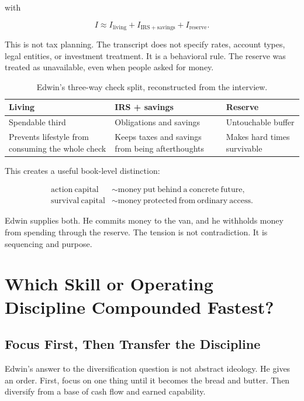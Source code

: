 \documentclass[11pt,oneside]{book}
\begin{document}
with

\begin{equation}
I\approx I_{\mathrm{living}}+I_{\mathrm{IRS+savings}}+I_{\mathrm{reserve}}.
\end{equation}

This is not tax planning. The transcript does not specify rates, account types, legal entities, or investment treatment. It is a behavioral rule. The reserve was treated as unavailable, even when people asked for money.

\begin{table}
\centering
\begin{tabular}{|p{.27\linewidth}|p{.27\linewidth}|p{.30\linewidth}|}
\hline
Living & IRS + savings & Reserve\\
\hline
Spendable third & Obligations and savings & Untouchable buffer\\
\hline
Prevents lifestyle from consuming the whole check & Keeps taxes and savings from being afterthoughts & Makes hard times survivable\\
\hline
\end{tabular}
\caption{Edwin's three-way check split, reconstructed from the interview.}
\end{table}

This creates a useful book-level distinction:

\begin{align}
\mathrm{action\ capital} &\sim \mathrm{money\ put\ behind\ a\ concrete\ future},\\
\mathrm{survival\ capital} &\sim \mathrm{money\ protected\ from\ ordinary\ access}.
\end{align}

Edwin supplies both. He commits money to the van, and he withholds money from spending through the reserve. The tension is not contradiction. It is sequencing and purpose.

\chapter{Which Skill or Operating Discipline Compounded Fastest?}

\section{Focus First, Then Transfer the Discipline}

Edwin's answer to the diversification question is not abstract ideology. He gives an order. First, focus on one thing until it becomes the bread and butter. Then diversify from a base of cash flow and earned capability.
\end{document}
